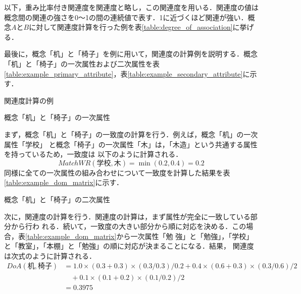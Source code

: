 \documentclass[japanese]{jnlp_1.4}
\begin{document}
以下，重み比率付き関連度を関連度と略し，この関連度\cite{watabe:06}を用いる．関連度の値は概念間の関連の強さを0〜1の間の連続値で表す．1に近づくほど関連が強い．概念$A$と$B$に対して関連度計算を行った例を表\ref{table:degree_of_association}に挙げる．

最後に，概念「机」と「椅子」を例に用いて，関連度の計算例を説明する．概念「机」と「椅子」の一次属性および二次属性を表\ref{table:example_primary_attribute}，表\ref{table:example_secondary_attribute}に示す．

\begin{table}[b]
\begin{minipage}[t]{200pt}
\caption{関連度計算の例}

\label{table:degree_of_association}
\end{minipage}
\hfill
\begin{minipage}[t]{200pt}
\caption{概念「机」と「椅子」の一次属性}

\label{table:example_primary_attribute}
\end{minipage}
\end{table}

まず，概念「机」と「椅子」の一致度の計算を行う．例えば，概念「机」の一次属性「学校」
と概念「椅子」の一次属性「木」は，「木造」という共通する属性を持っているため，一致度は
以下のように計算される．
\[
 MatchWR(学校,木)=\min(0.2,0.4)=0.2
\]
同様に全ての一次属性の組み合わせについて一致度を計算した結果を表\ref{table:example_dom_matrix}に示す．
\begin{table}[t]
\begin{minipage}[t]{282pt}
\caption{概念「机」と「椅子」の二次属性}

\label{table:example_secondary_attribute}
\end{minipage}
\hfill
\begin{minipage}[t]{118pt}
\setlength{\captionwidth}{118pt}

\label{table:example_dom_matrix}
\end{minipage}
\end{table}

次に，関連度の計算を行う．関連度の計算は，まず属性が完全に一致している部分から行わ
れる．続いて，一致度の大きい部分から順に対応を決める．この場合，表\ref{table:example_dom_matrix}から一次属性「勉
強」と「勉強」，「学校」と「教室」，「本棚」と「勉強」の順に対応が決まることになる．結果，
関連度は次式のように計算される．
\begin{align*}
 DoA(机,椅子) & = 1.0\times(0.3+0.3)\times(0.3/0.3)/0.2+0.4\times(0.6+0.3)\times(0.3/0.6)/2	\\
	& \quad {} +0.1\times(0.1+0.2)\times(0.1/0.2)/2	\\
	& =0.3975
\end{align*}
\end{document}
